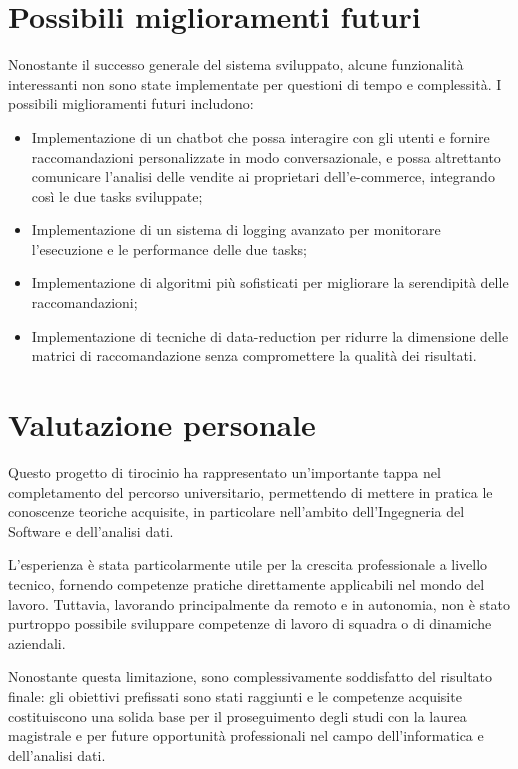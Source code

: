 \section{Possibili miglioramenti futuri}

Nonostante il successo generale del sistema sviluppato, alcune funzionalità interessanti non sono state implementate per questioni di tempo e complessità. I possibili miglioramenti futuri includono:

\begin{itemize}
    \item Implementazione di un chatbot che possa interagire con gli utenti e fornire raccomandazioni personalizzate in modo conversazionale, e possa altrettanto comunicare l'analisi delle vendite ai proprietari dell'e-commerce, integrando così le due tasks sviluppate;
    \item Implementazione di un sistema di logging avanzato per monitorare l'esecuzione e le performance delle due tasks;
    \item Implementazione di algoritmi più sofisticati per migliorare la serendipità delle raccomandazioni;
    \item Implementazione di tecniche di \gls{data-reduction} per ridurre la dimensione delle matrici di raccomandazione senza compromettere la qualità dei risultati.
\end{itemize}


\section{Valutazione personale}

Questo progetto di tirocinio ha rappresentato un'importante tappa nel completamento del percorso universitario, permettendo di mettere in pratica le conoscenze teoriche acquisite, in particolare nell'ambito dell'Ingegneria del Software e dell'analisi dati.

L'esperienza è stata particolarmente utile per la crescita professionale a livello tecnico, fornendo competenze pratiche direttamente applicabili nel mondo del lavoro. Tuttavia, lavorando principalmente da remoto e in autonomia, non è stato purtroppo possibile sviluppare competenze di lavoro di squadra o di dinamiche aziendali.

Nonostante questa limitazione, sono complessivamente soddisfatto del risultato finale: gli obiettivi prefissati sono stati raggiunti e le competenze acquisite costituiscono una solida base per il proseguimento degli studi con la laurea magistrale e per future opportunità professionali nel campo dell'informatica e dell'analisi dati.
